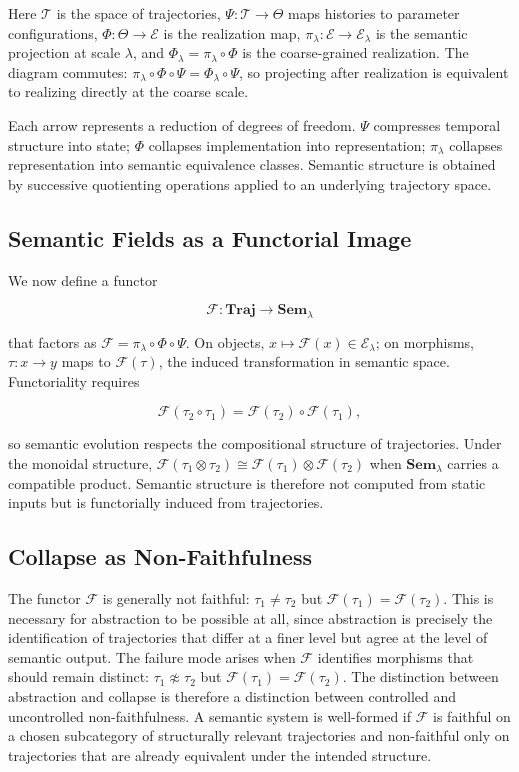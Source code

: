 \documentclass[11pt, twoside]{article}
\theoremstyle{plain}
\theoremstyle{definition}
\theoremstyle{remark}
\begin{document}
Here $\mathcal{T}$ is the space of trajectories, $\Psi : \mathcal{T} \to \Theta$ maps histories to parameter configurations, $\Phi : \Theta \to \mathcal{E}$ is the realization map, $\pi_\lambda : \mathcal{E} \to \mathcal{E}_\lambda$ is the semantic projection at scale $\lambda$, and $\Phi_\lambda = \pi_\lambda \circ \Phi$ is the coarse-grained realization. The diagram commutes: $\pi_\lambda \circ \Phi \circ \Psi = \Phi_\lambda \circ \Psi$, so projecting after realization is equivalent to realizing directly at the coarse scale.

Each arrow represents a reduction of degrees of freedom. $\Psi$ compresses temporal structure into state; $\Phi$ collapses implementation into representation; $\pi_\lambda$ collapses representation into semantic equivalence classes. Semantic structure is obtained by successive quotienting operations applied to an underlying trajectory space.

\subsection{Semantic Fields as a Functorial Image}

We now define a functor

\[
\mathcal{F} : \mathbf{Traj} \to \mathbf{Sem}_\lambda
\]

that factors as $\mathcal{F} = \pi_\lambda \circ \Phi \circ \Psi$. On objects, $x \mapsto \mathcal{F}(x) \in \mathcal{E}_\lambda$; on morphisms, $\tau : x \to y$ maps to $\mathcal{F}(\tau)$, the induced transformation in semantic space. Functoriality requires

\[
\mathcal{F}(\tau_2 \circ \tau_1) = \mathcal{F}(\tau_2) \circ \mathcal{F}(\tau_1),
\]

so semantic evolution respects the compositional structure of trajectories. Under the monoidal structure, $\mathcal{F}(\tau_1 \otimes \tau_2) \cong \mathcal{F}(\tau_1) \otimes \mathcal{F}(\tau_2)$ when $\mathbf{Sem}_\lambda$ carries a compatible product. Semantic structure is therefore not computed from static inputs but is functorially induced from trajectories.

\subsection{Collapse as Non-Faithfulness}

The functor $\mathcal{F}$ is generally not faithful: $\tau_1 \neq \tau_2$ but $\mathcal{F}(\tau_1) = \mathcal{F}(\tau_2)$. This is necessary for abstraction to be possible at all, since abstraction is precisely the identification of trajectories that differ at a finer level but agree at the level of semantic output. The failure mode arises when $\mathcal{F}$ identifies morphisms that should remain distinct: $\tau_1 \not\approx \tau_2$ but $\mathcal{F}(\tau_1) = \mathcal{F}(\tau_2)$. The distinction between abstraction and collapse is therefore a distinction between controlled and uncontrolled non-faithfulness. A semantic system is well-formed if $\mathcal{F}$ is faithful on a chosen subcategory of structurally relevant trajectories and non-faithful only on trajectories that are already equivalent under the intended structure.
\end{document}
